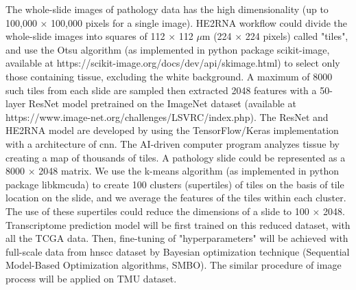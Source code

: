 \documentclass[12pt, a4paper]{article}
\begin{document}
The whole-slide images of pathology data has the high dimensionality (up to 100,000 × 100,000 pixels for a single image).
HE2RNA workflow could divide the whole-slide images into squares of 112 × 112 $\mu$m (224 × 224 pixels) called "tiles", and use the Otsu algorithm\citep{Otsu1979} (as implemented in python package scikit-image, available at https://scikit-image.org/docs/dev/api/skimage.html) to select only those containing tissue, excluding the white background. 
A maximum of 8000 such tiles from each slide are sampled then extracted 2048 features with a 50-layer ResNet model\citep{He2016a}  pretrained on the ImageNet dataset (available at https://www.image-net.org/challenges/LSVRC/index.php).
The ResNet and HE2RNA model are developed by using the TensorFlow/Keras implementation with a architecture of \acrfull{cnn}.
The AI-driven computer program analyzes tissue by creating a map of thousands of tiles.
A pathology slide could be represented as a 8000 × 2048 matrix.
We use the k-means algorithm (as implemented in python package libkmcuda) to create 100 clusters (supertiles) of tiles on the basis of tile location on the slide, and we average the features of the tiles within each cluster. The use of these supertiles could reduce the dimensions of a slide to 100 × 2048. %
Transcriptome prediction model will be first trained on this reduced dataset, with all the TCGA data. Then, fine-tuning of "hyperparameters" will be achieved with full-scale data from \acrshort{hnscc} dataset by Bayesian optimization technique (Sequential Model-Based Optimization algorithms, SMBO)\citep{Hutter2011}.
The similar procedure of image process will be applied on TMU dataset.\\[0.5cm]

\end{document}
